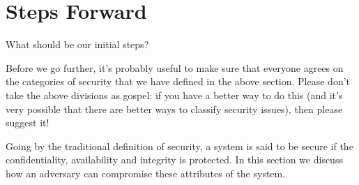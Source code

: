 \section{Steps Forward}
What should be our initial steps?  

\medskip

\noindent Before we go further, it's probably useful to make sure that everyone agrees on the categories of security that we have defined in the above section.  Please don't take the above divisions as gospel:  if you have a better way to do this (and it's very possible that there are better ways to classify security issues), then please suggest it!

\noindent Going by the traditional definition of security, a system is said to be secure if the confidentiality, availability and integrity is protected. In this section we discuss how an adversary can compromise these attributes of the system.